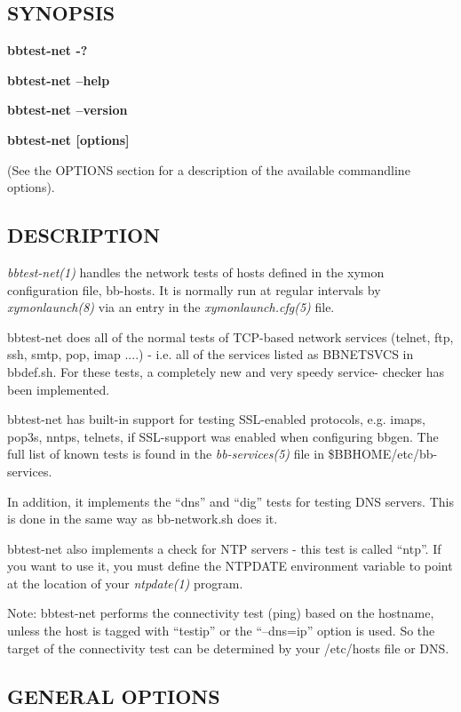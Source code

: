 \subsection{SYNOPSIS}
\textbf{bbtest-net -?}
 
\textbf{bbtest-net --help}
 
\textbf{bbtest-net --version}
 
\textbf{bbtest-net [options]}
 
 (See the OPTIONS section for a description of the available commandline options). 

 
\subsection{DESCRIPTION}
\emph{bbtest-net(1)} handles the network tests of hosts defined in the
xymon configuration file, bb-hosts. It is normally run at regular
intervals by \emph{xymonlaunch(8)} via an entry in the
\emph{xymonlaunch.cfg(5)} file. 

 bbtest-net does all of the normal tests of TCP-based network services
 (telnet, ftp, ssh, smtp, pop, imap ....) - i.e. all of the services
 listed as BBNETSVCS in bbdef.sh. For these tests, a completely new
 and very speedy service- checker has been implemented. 



  bbtest-net has built-in support for testing SSL-enabled protocols,
  e.g. imaps, pop3s, nntps, telnets, if SSL-support was enabled when
  configuring bbgen. The full list of known tests is found in the
  \emph{bb-services(5)} file in \$BBHOME/etc/bb-services. 



  In addition, it implements the ``dns'' and ``dig'' tests for testing
  DNS servers. This is done in the same way as bb-network.sh does it. 


  bbtest-net also implements a check for NTP servers - this test is
  called ``ntp''. If you want to use it, you must define the NTPDATE
  environment variable to point at the location of your
  \emph{ntpdate(1)} program. 



  Note: bbtest-net performs the connectivity test (ping) based on the
  hostname, unless the host is tagged with ``testip'' or the
  ``--dns=ip'' option is used. So the target of the connectivity test
  can be determined by your /etc/hosts file or DNS. 



 
\subsection{GENERAL OPTIONS}



